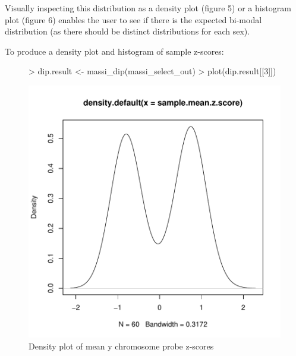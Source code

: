 \documentclass{article}
\begin{document}
Visually inspecting this distribution as a density plot (figure 5) or a histogram plot (figure 6) enables the user to see if there is the expected bi-modal distribution  (as there should be distinct distributions for each sex).

To produce a density plot and histogram of sample z-scores:
\begin{figure}
\begin{center}
\begin{Schunk}
\begin{Sinput}
> dip.result <- massi_dip(massi_select_out)
> plot(dip.result[[3]])
\end{Sinput}
\end{Schunk}
\includegraphics{massiR_Vignette-fig5}
\end{center}
\caption{Density plot of mean y chromosome probe z-scores}
\label{fig:fig5}
\end{figure}
\end{document}
